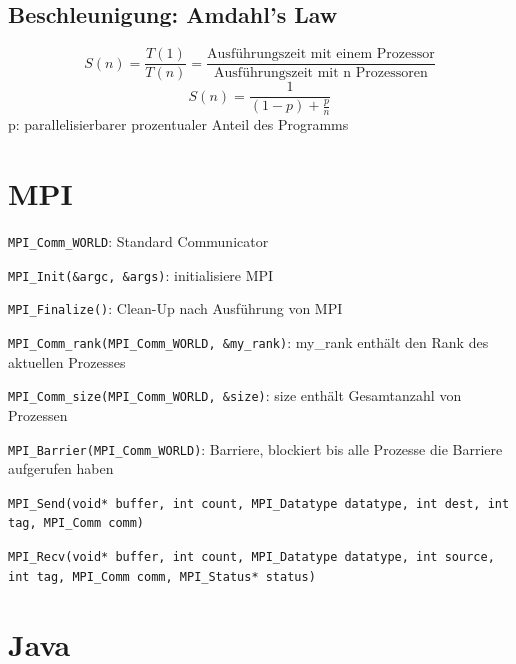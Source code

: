 \subsection{Beschleunigung: Amdahl's Law }
$$S(n) = \frac{T(1)}{T(n)}=\frac{\text{Ausführungszeit mit einem Prozessor}}{\text{Ausführungszeit mit n Prozessoren}}$$
$$S(n)= \frac{1}{(1-p)+ \frac{p}{n}}$$
p: parallelisierbarer prozentualer Anteil des Programms

\section{MPI}
\begin{compactitem}
	\item \texttt{MPI\_Comm\_WORLD}: Standard Communicator	
	\item \texttt{MPI\_Init(\&argc, \&args)}: initialisiere MPI
	\item \texttt{MPI\_Finalize()}: Clean-Up nach Ausführung von MPI
	\item \texttt{MPI\_Comm\_rank(MPI\_Comm\_WORLD, \&my\_rank)}: my\_rank enthält den Rank des aktuellen Prozesses
	\item \texttt{MPI\_Comm\_size(MPI\_Comm\_WORLD, \&size)}: size enthält Gesamtanzahl von Prozessen
	\item \texttt{MPI\_Barrier(MPI\_Comm\_WORLD)}: Barriere, blockiert bis alle Prozesse die Barriere aufgerufen haben
	\item \texttt{MPI\_Send(void* buffer, int count, MPI\_Datatype datatype, int dest, int tag, MPI\_Comm comm)}
	\item \texttt{MPI\_Recv(void* buffer, int count, MPI\_Datatype datatype, int source, int tag, MPI\_Comm comm, MPI\_Status* status)}
\end{compactitem}

\section{Java}
